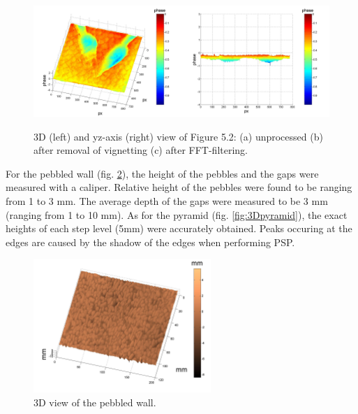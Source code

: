 \begin{figure}[p]
{		{\includegraphics[width=0.5\textwidth]{figures/3Dvfiltered.jpg}}{\includegraphics[width=0.5\textwidth]{figures/3Dvfiltered_yz.jpg}}}
	\caption[3D reconstruction of styrofoam with engraving]{3D (left) and yz-axis (right) view of Figure 5.2: (a) unprocessed (b) after removal of vignetting (c) after FFT-filtering.}
	\label{fig:3DV}
\end{figure}

For the pebbled wall (fig. \ref{fig:3Dstone}), the height of the pebbles and the gaps were measured with a caliper. Relative height of the pebbles were found to be ranging from 1 to 3 mm. The average depth of the gaps were measured to be 3 mm (ranging from 1 to 10 mm). As for the pyramid (fig. \ref{fig:3Dpyramid}), the exact heights of each step level (5mm) were accurately obtained. Peaks occuring at the edges are caused by the shadow of the edges when performing PSP.

\captionsetup[figure]{width=5in}
\begin{figure}[h!]
	\centering
	\includegraphics[width=0.6\textwidth]{figures/3Dpebble.jpg}
	\caption{3D view of the pebbled wall.}
	\label{fig:3Dstone}
\end{figure}


